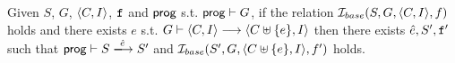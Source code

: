 \documentclass[12pt]{article}
\begin{document}
  

\begin{lemma}
  \label{lemma:simb-step}
  Given $S$, $G$, $\langle C, I \rangle$, ${\mathtt{f}}$ and $\mathsf{prog}$
  s.t. $\mathsf{prog} \vdash G$,
  if the relation $\mathcal{I}_{base}(S, G, \langle C, I \rangle, f)$ holds and
  there exists $e$ s.t. $G \vdash \langle C, I \rangle \longrightarrow \langle C \uplus \{e\}, I \rangle$ then
  there exists $\hat{e}, S', {\mathtt{f}}'$ such that
  $\Prog \vdash S \esstep{\hat{e}} S'$
  and $\mathcal{I}_{base}(S', G, \langle C \uplus \{e\}, I \rangle, f')$ holds.
\end{lemma}








\end{document}
